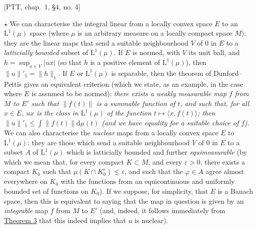 \documentclass[british]{article}
\newcommand{\oldpage}[1]{\marginpar{\footnotesize$\Big\vert$ \textit{p.~#1}}}
\begin{document}
{[}PTT, chap.~1, §4, no. 4{]}

\medskip

\(\star\) We can characterise the integral linear from a locally convex
space \(E\) to an \(\mathrm{L}^1(\mu)\) space (where \(\mu\) is an
arbitrary measure on a locally compact space \(M\)): they are the linear
maps that send a suitable neighbourhood \(V\) of \(0\) in \(E\) to a
\emph{latticially bounded} subset of \(\mathrm{L}^1(\mu)\). If \(E\) is
normed, with \(V\) its unit ball, and \(h=\sup_{x\in V}|ux|\) (so that
\(h\) is a positive element of \(\mathrm{L}^1(\mu)\)), then
\(\|u\|'_1=\|h\|_1\). If \(E\) or \(\mathrm{L}^1(\mu)\) is separable,
then the theorem of Dunford--Pettis gives an equivalent criterion (which
we state, as an example, in the case where \(E\) is assumed to be
normed): \emph{there exists a weakly measurable map \(f\) from \(M\) to
\(E'\) such that \(\|f(t)\|\) is a summable function of \(t\), and such
that, for all \(x\in E\), \(ux\) is the class in \(\mathrm{L}^1(\mu)\)
of the function \(t\mapsto\langle x,f(t)\rangle\); then
\(\|u\|'_1\leqslant\int\|f(t)\|\mathrm{d}\mu(t)\) (and we have equality
for a suitable choice of \(f\)).} We can also characterise the
\emph{nuclear} maps from a locally convex space \(E\) to
\(\mathrm{L}^1(\mu)\): they are those which send a suitable
neighbourhood \(V\) of \(0\) in \(E\) to a subset \(A\) of
\(\mathrm{L}^1(\mu)\) which is latticially bounded and further
\emph{equimeasurable} (by which we mean that, for every compact
\(K\subset M\), and every \(\varepsilon>0\), there exists a compact
\(K_0\) such that \(\mu(K\cap K_0^c)\leqslant\varepsilon\), and such
that the \(\varphi\in A\) agree almost everywhere on \(K_0\) with the
functions from an equicontinuous and uniformly bounded set of functions
on \(K_0\)). If we suppose, for simplicity, that \(E\) is a Banach
space, then this is equivalent to saying that the map in question is
given by an \emph{integrable} \autocite{2} map \(f\) from \(M\) to
\(E'\) (and, indeed, it follows immediately from
\hyperref[section-1-theorem-3]{Theorem 3} that this indeed implies that
\(u\) is nuclear).

\oldpage{92}
\end{document}
